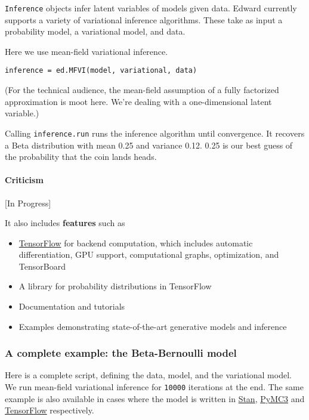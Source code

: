 \texttt{Inference} objects infer latent variables of models given data.
Edward currently supports a variety of variational inference algorithms.
These take as input a probability model, a variational model, and data.

Here we use mean-field variational inference.

\begin{verbatim}
inference = ed.MFVI(model, variational, data)
\end{verbatim}

(For the technical audience, the mean-field assumption of a fully
factorized approximation is moot here. We're dealing with a
one-dimensional latent variable.)

Calling \texttt{inference.run} runs the inference algorithm until
convergence. It recovers a Beta distribution with mean 0.25 and variance
0.12. 0.25 is our best guess of the probability that the coin lands
heads.

\paragraph{Criticism}\label{criticism}

{[}In Progress{]}




It also includes \textbf{features} such as
\begin{itemize}
\item \href{https://www.tensorflow.org}{TensorFlow} for backend computation,
  which includes automatic differentiation, GPU support, computational
  graphs, optimization, and TensorBoard
\item A library for probability distributions in TensorFlow
\item Documentation and tutorials
\item Examples demonstrating state-of-the-art generative models and
  inference
\end{itemize}


\subsubsection{A complete example: the Beta-Bernoulli
model}\label{a-complete-example-the-beta-bernoulli-model}

Here is a complete script, defining the data, model, and the variational
model. We run mean-field variational inference for \texttt{10000}
iterations at the end. The same example is also available in cases where
the model is written in
\href{https://github.com/blei-lab/edward/blob/master/examples/beta_bernoulli_stan.py}{Stan},
\href{https://github.com/blei-lab/edward/blob/master/examples/beta_bernoulli_pymc3.py}{PyMC3}
and
\href{https://github.com/blei-lab/edward/blob/master/examples/beta_bernoulli_tf.py}{TensorFlow}
respectively.

